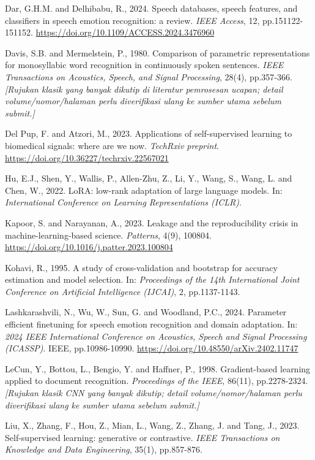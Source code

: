 \noindent
Dar, G.H.M. and Delhibabu, R., 2024. Speech databases, speech features,
and classifiers in speech emotion recognition: a review. \textit{IEEE
Access}, 12, pp.151122-151152.
\url{https://doi.org/10.1109/ACCESS.2024.3476960}

\noindent
Davis, S.B. and Mermelstein, P., 1980. Comparison of parametric
representations for monosyllabic word recognition in continuously
spoken sentences. \textit{IEEE Transactions on Acoustics, Speech, and
Signal Processing}, 28(4), pp.357-366. \emph{[Rujukan klasik yang banyak
dikutip di literatur pemrosesan ucapan; detail volume/nomor/halaman
perlu diverifikasi ulang ke sumber utama sebelum submit.]}

\noindent
Del Pup, F. and Atzori, M., 2023. Applications of self-supervised
learning to biomedical signals: where are we now. \textit{TechRxiv
preprint}. \url{https://doi.org/10.36227/techrxiv.22567021}

\noindent
Hu, E.J., Shen, Y., Wallis, P., Allen-Zhu, Z., Li, Y., Wang, S., Wang, L.
and Chen, W., 2022. LoRA: low-rank adaptation of large language models.
In: \textit{International Conference on Learning Representations
(ICLR)}.

\noindent
Kapoor, S. and Narayanan, A., 2023. Leakage and the reproducibility
crisis in machine-learning-based science. \textit{Patterns}, 4(9),
100804. \url{https://doi.org/10.1016/j.patter.2023.100804}

\noindent
Kohavi, R., 1995. A study of cross-validation and bootstrap for accuracy
estimation and model selection. In: \textit{Proceedings of the 14th
International Joint Conference on Artificial Intelligence (IJCAI)}, 2,
pp.1137-1143.

\noindent
Lashkarashvili, N., Wu, W., Sun, G. and Woodland, P.C., 2024. Parameter
efficient finetuning for speech emotion recognition and domain
adaptation. In: \textit{2024 IEEE International Conference on
Acoustics, Speech and Signal Processing (ICASSP)}. IEEE, pp.10986-10990.
\url{https://doi.org/10.48550/arXiv.2402.11747}

\noindent
LeCun, Y., Bottou, L., Bengio, Y. and Haffner, P., 1998. Gradient-based
learning applied to document recognition. \textit{Proceedings of the
IEEE}, 86(11), pp.2278-2324. \emph{[Rujukan klasik CNN yang banyak
dikutip; detail volume/nomor/halaman perlu diverifikasi ulang ke sumber
utama sebelum submit.]}

\noindent
Liu, X., Zhang, F., Hou, Z., Mian, L., Wang, Z., Zhang, J. and Tang, J.,
2023. Self-supervised learning: generative or contrastive. \textit{IEEE
Transactions on Knowledge and Data Engineering}, 35(1), pp.857-876.

